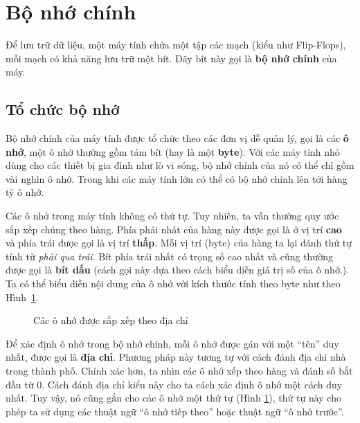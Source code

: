 \section{Bộ nhớ chính}

Để lưu trữ dữ liệu, một máy tính chứa một tập các mạch (kiểu như Flip-Flops), mỗi mạch có
khả năng lưu trữ một bít. Dãy bít này gọi là \textbf{bộ nhớ chính} của máy.

\subsection*{Tổ chức bộ nhớ}
Bộ nhớ chính của máy tính được tổ chức theo các đơn vị dễ quản lý, gọi là các \textbf{ô
  nhớ}, một ô nhớ thường gồm tám bít (hay là một \textbf{byte}). Với các máy tính nhỏ dùng
cho các thiết bị gia đình như lò vi sóng, bộ nhớ chính của nó có thể chỉ gồm vài nghìn ô
nhớ. Trong khi các máy tính lớn có thể có bộ nhớ chính lên tới hàng tỷ ô nhớ.

Các ô nhớ trong máy tính không có thứ tự. Tuy nhiên, ta vẫn thường quy ước sắp xếp chúng
theo hàng. Phía phải nhất của hàng này được gọi là ở vị trí \textbf{cao} và phía trái được
gọi là vị trí \textbf{thấp}. Mỗi vị trí (byte) của hàng ta lại đánh thứ tự tính từ
\textit{phải qua trái}. Bít phía trái nhất có trọng số cao nhất và cũng thường được gọi là
\textbf{bít dấu} (cách gọi này dựa theo cách biểu diễn giá trị số của ô nhớ.).  Ta có thể
biểu diễn nội dung của ô nhớ với kích thước tính theo byte như theo Hình~\ref{fig:fig1.8}.

\begin{figure}[tb]
\centering
\caption{Các ô nhớ được sắp xếp theo địa chỉ}
  \label{fig:fig1.8}
\end{figure}

Để xác định ô nhớ trong bộ nhớ chính, mỗi ô nhớ được gán với một ``tên'' duy nhất, được
gọi là \textbf{địa chỉ}. Phương pháp này tương tự với cách đánh địa chỉ nhà trong thành
phố. Chính xác hơn, ta nhìn các ô nhớ xếp theo hàng và đánh số bắt đầu từ $0$. Cách đánh
địa chỉ kiểu này cho ta cách xác định ô nhớ một cách duy nhất. Tuy vậy, nó cũng gắn cho
các ô nhớ một thứ tự (Hình \ref{fig:fig1.8}), thứ tự này cho phép ta sử dụng các thuật ngữ ``ô
nhớ tiếp theo''  hoặc thuật ngữ ``ô nhớ trước''.


